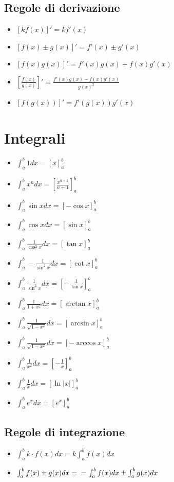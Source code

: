 \documentclass[11pt]{article}
\theoremstyle{definition}
\theoremstyle{remark}
\begin{document}
\subsection*{Regole di derivazione}
\begin{itemize}
    \item $[kf(x)]'=kf'(x)$
    \item $[f(x)\pm g(x)]'=f'(x)\pm g'(x)$
    \item $[f(x)g(x)]'=f'(x)g(x) + f(x)g'(x)$
    \item $[\frac{f(x)}{g(x)}]'=\frac{f'(x)g(x) - f(x)g'(x)}{g(x)^2}$
    \item $[f(g(x))]'=f'(g(x))g'(x)$
\end{itemize}

\section*{Integrali}
\begin{itemize}
    \item $\int_{a}^{b} 1 dx= \left[x\right]_a^b$
    \item $\int_{a}^{b} x^n dx= \left[ \frac{x^{n+1}}{n+1}\right]_a^b$
    \item $\int_{a}^{b} \sin x dx= \left[-\cos x\right]_a^b$
    \item $\int_{a}^{b} \cos x dx= \left[\sin x\right]_a^b$
    \item $\int_{a}^{b} \frac{1}{\cos^2 x} dx= \left[\tan x\right]_a^b$
    \item $\int_{a}^{b} -\frac{1}{\sin^2 x} dx= \left[\cot x\right]_a^b$
    \item $\int_{a}^{b} \frac{1}{\sin^2 x} dx= \left[- \frac{1}{\tan x}\right]_a^b$
    \item $\int_{a}^{b} \frac{1}{1+x^2} dx= \left[\arctan x\right]_a^b$
    \item $\int_{a}^{b} \frac{1}{\sqrt{1-x^2}} dx= \left[\arcsin x\right]_a^b$
    \item $\int_{a}^{b} \frac{1}{\sqrt{1-x^2}} dx= \left[-\arccos x\right]_a^b$
    \item $\int_{a}^{b} \frac{1}{x^2} dx= \left[-\frac{1}{x}\right]_a^b$
    \item $\int_{a}^{b} \frac{1}{x} dx= \left[\ln|x|\right]_a^b$
    \item $\int_{a}^{b} e^x dx=\left[ e^x \right]_a^b$
\end{itemize}

\subsection*{Regole di integrazione}
\begin{itemize}
    \item $\int_{a}^{b} k\cdot f(x) dx = k\int_{a}^{b} f(x) dx$
    \item $\int_{a}^{b} f(x)\pm g(x) dx =\\= \int_{a}^{b} f(x) dx \pm \int_{a}^{b} g(x) dx$
\end{itemize}
\end{document}
